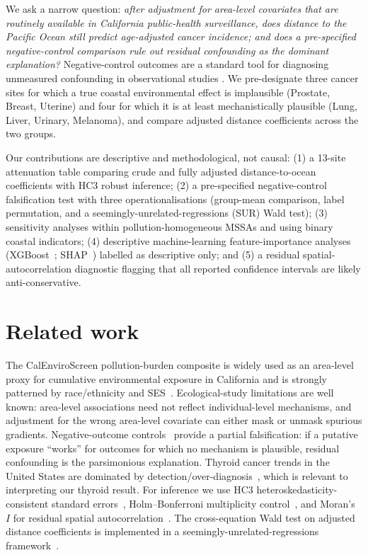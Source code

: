 \documentclass[11pt]{article}
\begin{document}
We ask a narrow question: \emph{after adjustment for area-level covariates that are routinely available in California public-health surveillance, does distance to the Pacific Ocean still predict age-adjusted cancer incidence; and does a pre-specified negative-control comparison rule out residual confounding as the dominant explanation?} Negative-control outcomes are a standard tool for diagnosing unmeasured confounding in observational studies \citep{Lipsitch2010NegativeControls}. We pre-designate three cancer sites for which a true coastal environmental effect is implausible (Prostate, Breast, Uterine) and four for which it is at least mechanistically plausible (Lung, Liver, Urinary, Melanoma), and compare adjusted distance coefficients across the two groups.

Our contributions are descriptive and methodological, not causal: (1) a 13-site attenuation table comparing crude and fully adjusted distance-to-ocean coefficients with HC3 robust inference; (2) a pre-specified negative-control falsification test with three operationalisations (group-mean comparison, label permutation, and a seemingly-unrelated-regressions (SUR) Wald test); (3) sensitivity analyses within pollution-homogeneous MSSAs and using binary coastal indicators; (4) descriptive machine-learning feature-importance analyses (XGBoost~\citep{Chen2016XGBoost}; SHAP~\citep{Lundberg2017SHAP}) labelled as descriptive only; and (5) a residual spatial-autocorrelation diagnostic flagging that all reported confidence intervals are likely anti-conservative.

\section{Related work}
The CalEnviroScreen pollution-burden composite is widely used as an area-level proxy for cumulative environmental exposure in California and is strongly patterned by race/ethnicity and SES~\citep{Cushing2015CalEnviroScreen}. Ecological-study limitations \citep{Morgenstern1995} are well known: area-level associations need not reflect individual-level mechanisms, and adjustment for the wrong area-level covariate can either mask or unmask spurious gradients. Negative-outcome controls~\citep{Lipsitch2010NegativeControls} provide a partial falsification: if a putative exposure ``works'' for outcomes for which no mechanism is plausible, residual confounding is the parsimonious explanation. Thyroid cancer trends in the United States are dominated by detection/over-diagnosis~\citep{Davies2014Thyroid}, which is relevant to interpreting our thyroid result. For inference we use HC3 heteroskedasticity-consistent standard errors~\citep{MacKinnonWhite1985HC3}, Holm--Bonferroni multiplicity control~\citep{Holm1979}, and Moran's $I$ for residual spatial autocorrelation~\citep{Moran1950}. The cross-equation Wald test on adjusted distance coefficients is implemented in a seemingly-unrelated-regressions framework~\citep{Zellner1962SUR}.
\end{document}
